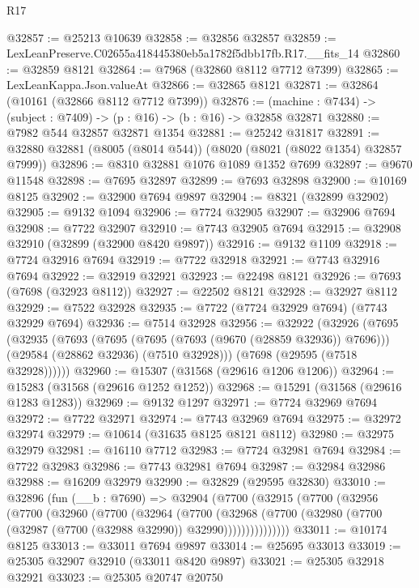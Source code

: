 \begin{lexlean}{R17}
\begin{coremodule}
@32857 := @25213 @10639
@32858 := @32856 @32857
@32859 := LexLeanPreserve.C02655a418445380eb5a1782f5dbb17fb.R17.__fits_14
@32860 := @32859 @8121
@32864 := @7968 (@32860 @8112 @7712 @7399)
@32865 := LexLeanKappa.Json.valueAt
@32866 := @32865 @8121
@32871 := @32864 (@10161 (@32866 @8112 @7712 @7399))
@32876 := (machine : @7434) -> (subject : @7409) -> (p : @16) -> (b : @16) -> @32858 @32871
@32880 := @7982 @544 @32857 @32871 @1354
@32881 := @25242 @31817
@32891 := @32880 @32881 (@8005 (@8014 @544)) (@8020 (@8021 (@8022 @1354) @32857 @7999))
@32896 := @8310 @32881 @1076 @1089 @1352 @7699
@32897 := @9670 @11548
@32898 := @7695 @32897
@32899 := @7693 @32898
@32900 := @10169 @8125
@32902 := @32900 @7694 @9897
@32904 := @8321 (@32899 @32902)
@32905 := @9132 @1094
@32906 := @7724 @32905
@32907 := @32906 @7694
@32908 := @7722 @32907
@32910 := @7743 @32905 @7694
@32915 := @32908 @32910 (@32899 (@32900 @8420 @9897))
@32916 := @9132 @1109
@32918 := @7724 @32916 @7694
@32919 := @7722 @32918
@32921 := @7743 @32916 @7694
@32922 := @32919 @32921
@32923 := @22498 @8121
@32926 := @7693 (@7698 (@32923 @8112))
@32927 := @22502 @8121
@32928 := @32927 @8112
@32929 := @7522 @32928
@32935 := @7722 (@7724 @32929 @7694) (@7743 @32929 @7694)
@32936 := @7514 @32928
@32956 := @32922
    (@32926
      (@7695
        (@32935
          (@7693
            (@7695 (@7695 (@7693 (@9670 (@28859 @32936)) @7696)))
            (@29584 (@28862 @32936) (@7510 @32928)))
          (@7698 (@29595 (@7518 @32928))))))
@32960 := @15307 (@31568 (@29616 @1206 @1206))
@32964 := @15283 (@31568 (@29616 @1252 @1252))
@32968 := @15291 (@31568 (@29616 @1283 @1283))
@32969 := @9132 @1297
@32971 := @7724 @32969 @7694
@32972 := @7722 @32971
@32974 := @7743 @32969 @7694
@32975 := @32972 @32974
@32979 := @10614 (@31635 @8125 @8121 @8112)
@32980 := @32975 @32979
@32981 := @16110 @7712
@32983 := @7724 @32981 @7694
@32984 := @7722 @32983
@32986 := @7743 @32981 @7694
@32987 := @32984 @32986
@32988 := @16209 @32979
@32990 := @32829 (@29595 @32830)
@33010 := @32896
    (fun (__b : @7690) =>
    @32904
      (@7700
        (@32915
          (@7700
            (@32956
              (@7700
                (@32960
                  (@7700
                    (@32964
                      (@7700
                        (@32968
                          (@7700
                            (@32980 (@7700 (@32987 (@7700 (@32988 @32990)) @32990)))))))))))))))
@33011 := @10174 @8125
@33013 := @33011 @7694 @9897
@33014 := @25695 @33013
@33019 := @25305 @32907 @32910 (@33011 @8420 @9897)
@33021 := @25305 @32918 @32921
@33023 := @25305 @20747 @20750

\end{coremodule}
\end{lexlean}
